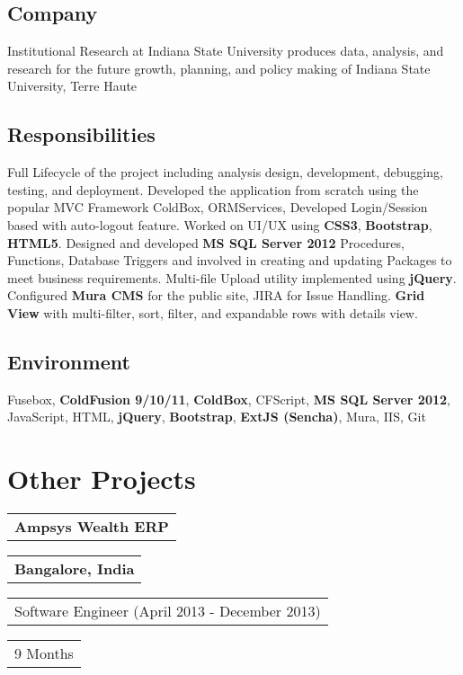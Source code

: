 \documentclass[letterpaper,11pt]{article}
\begin{document}
    \subsection{Company}
    Institutional Research at Indiana State University produces data, analysis, and research for the future growth, planning, and policy making of Indiana State University, Terre Haute

    \subsection{Responsibilities}
    Full Lifecycle of the project including analysis design, development, debugging, testing, and deployment. Developed the application from scratch using the popular MVC Framework ColdBox, ORMServices, Developed Login/Session based with auto-logout feature. Worked on UI/UX using \textbf{CSS3}, \textbf{Bootstrap}, \textbf{HTML5}. Designed and developed \textbf{MS SQL Server 2012} Procedures, Functions, Database Triggers and involved in creating and updating Packages to meet business requirements. Multi-file Upload utility implemented using \textbf{jQuery}. Configured \textbf{Mura CMS} for the public site, JIRA for Issue Handling. \textbf{Grid View} with multi-filter, sort, filter, and expandable rows with details view.

    \subsection{Environment}
    Fusebox, \textbf{ColdFusion 9/10/11}, \textbf{ColdBox}, CFScript, \textbf{MS SQL Server 2012}, JavaScript, HTML, \textbf{jQuery}, \textbf{Bootstrap}, \textbf{ExtJS (Sencha)}, Mura, IIS, Git


    \vspace{1.27cm}
    \section{Other Projects}


    \vspace{0.64cm}
    \noindent
    \begin{tabular}[t]{@{}l}
    \textbf{Ampsys Wealth ERP}
    \end{tabular}
    \hfill
    \begin{tabular}[t]{l@{}}
    \textbf{Bangalore, India}
    \end{tabular}
    \noindent\newline
    \begin{tabular}[t]{@{}l}
    Software Engineer (April 2013 - December 2013)
    \end{tabular}
    \hfill
    \begin{tabular}[t]{l@{}}
    9 Months
    \end{tabular}
\end{document}
